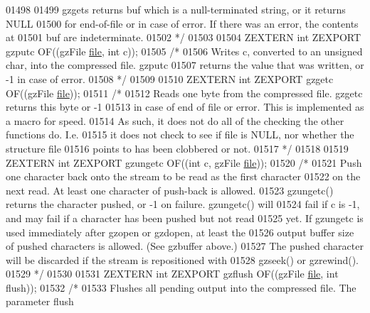 \begin{DoxyCode}
01498 \textcolor{comment}{}
01499 \textcolor{comment}{     gzgets returns buf which is a null-terminated string, or it returns NULL}
01500 \textcolor{comment}{   for end-of-file or in case of error.  If there was an error, the contents at}
01501 \textcolor{comment}{   buf are indeterminate.}
01502 \textcolor{comment}{*/}
01503 
01504 ZEXTERN \textcolor{keywordtype}{int} ZEXPORT gzputc OF((gzFile \hyperlink{structfile}{file}, \textcolor{keywordtype}{int} c));
01505 \textcolor{comment}{/*}
01506 \textcolor{comment}{     Writes c, converted to an unsigned char, into the compressed file.  gzputc}
01507 \textcolor{comment}{   returns the value that was written, or -1 in case of error.}
01508 \textcolor{comment}{*/}
01509 
01510 ZEXTERN \textcolor{keywordtype}{int} ZEXPORT gzgetc OF((gzFile \hyperlink{structfile}{file}));
01511 \textcolor{comment}{/*}
01512 \textcolor{comment}{     Reads one byte from the compressed file.  gzgetc returns this byte or -1}
01513 \textcolor{comment}{   in case of end of file or error.  This is implemented as a macro for speed.}
01514 \textcolor{comment}{   As such, it does not do all of the checking the other functions do.  I.e.}
01515 \textcolor{comment}{   it does not check to see if file is NULL, nor whether the structure file}
01516 \textcolor{comment}{   points to has been clobbered or not.}
01517 \textcolor{comment}{*/}
01518 
01519 ZEXTERN \textcolor{keywordtype}{int} ZEXPORT gzungetc OF((\textcolor{keywordtype}{int} c, gzFile \hyperlink{structfile}{file}));
01520 \textcolor{comment}{/*}
01521 \textcolor{comment}{     Push one character back onto the stream to be read as the first character}
01522 \textcolor{comment}{   on the next read.  At least one character of push-back is allowed.}
01523 \textcolor{comment}{   gzungetc() returns the character pushed, or -1 on failure.  gzungetc() will}
01524 \textcolor{comment}{   fail if c is -1, and may fail if a character has been pushed but not read}
01525 \textcolor{comment}{   yet.  If gzungetc is used immediately after gzopen or gzdopen, at least the}
01526 \textcolor{comment}{   output buffer size of pushed characters is allowed.  (See gzbuffer above.)}
01527 \textcolor{comment}{   The pushed character will be discarded if the stream is repositioned with}
01528 \textcolor{comment}{   gzseek() or gzrewind().}
01529 \textcolor{comment}{*/}
01530 
01531 ZEXTERN \textcolor{keywordtype}{int} ZEXPORT gzflush OF((gzFile \hyperlink{structfile}{file}, \textcolor{keywordtype}{int} flush));
01532 \textcolor{comment}{/*}
01533 \textcolor{comment}{     Flushes all pending output into the compressed file.  The parameter flush}

\end{DoxyCode}

